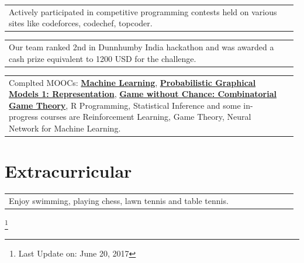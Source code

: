 \documentclass[a4paper]{article} %
\newcommand{\verticalspacing}{-0.25cm}
\newcommand{\bulletspace}{0.7cm}
\newcommand{\projectheadspacing}{6.9cm}
\newcommand{\skill}[2]{%
    \begin{tabular}{p{0.60\linewidth}r}
        \small {#2} & \multicolumn{1}{m{ \projectheadspacing{} }}{\raggedleft \textsc{\small #1}}\\
    \end{tabular}
    \vspace{\verticalspacing{}}
}
\newcommand{\lineskill}[2]{%
    \begin{tabular}{p{0.98\linewidth}r}
        \small {#2} & \multicolumn{1}{m{ \projectheadspacing{} }}{\raggedleft \textsc{\small #1}}\\
    \end{tabular}
    \vspace{\verticalspacing{}}
    \vspace{-0.0cm} %
}
\begin{document}

\lineskill
	{}
    {Actively participated in competitive programming contests held on various sites like codeforces, codechef, topcoder.}

\lineskill
	{}
	{Our team ranked 2nd in Dunnhumby India hackathon and was awarded a cash prize equivalent to 1200 USD for the challenge.}

\lineskill
	{}
	{Complted MOOCs: \href{https://www.coursera.org/account/accomplishments/records/7A66NHG2A623}{\textbf{Machine Learning}}, \href{https://www.coursera.org/account/accomplishments/records/JRHRADFQSTAF}{\textbf{Probabilistic Graphical Models 1: Representation}}, \href{https://www.dropbox.com/s/uda09uulzed6zc7/Game\%20without\%20chance\%20certificate.pdf}{\textbf{Game without Chance: Combinatorial Game Theory}}, R Programming, Statistical Inference and some in-progress courses are Reinforcement Learning, Game Theory, Neural Network for Machine Learning.}




\section{Extracurricular}

\lineskill
    {}
    {Enjoy swimming, playing chess, lawn tennis and table tennis.}

\vspace{-0.65cm}
\let\thefootnote\relax\footnote{Last Update on: June 20, 2017}
\end{document}
